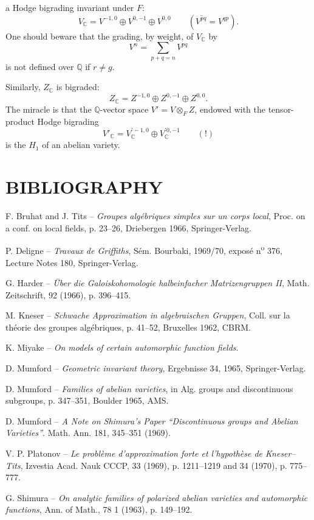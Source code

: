 \documentclass[10pt]{article}
\newcommand{\C}{\mathbb C}
\newcommand{\Q}{\mathbb Q}
\begin{document}
a Hodge bigrading invariant under $F$:
\[
V_{\C}=V^{-1,0}\oplus V^{0,-1}\oplus V^{0,0}
\qquad(\overline{V^{pq}}=V^{qp}).
\]
One should beware that the grading, by weight, of $V_{\C}$ by
\[
V^n=\sum_{p+q=n}V^{pq}
\]
is not defined over $\Q$ if $r\ne g$.

Similarly, $Z_{\C}$ is bigraded:
\[
Z_{\C}=Z^{-1,0}\oplus Z^{0,-1}\oplus Z^{0,0}.
\]
The miracle is that the $\Q$-vector space $V'=V\otimes_F Z$, endowed with the tensor-product Hodge bigrading
\[
V'_{\C}=V_{\C}^{\prime -1,0}\oplus V_{\C}^{\prime 0,-1}\qquad(!)
\]
is the $H_1$ of an abelian variety.

\section*{BIBLIOGRAPHY}

\begin{description}[leftmargin=3.0em,labelwidth=2.4em,style=nextline]
\item[{[1]}] F. Bruhat and J. Tits -- \emph{Groupes algébriques simples sur un corps local}, Proc. on a conf. on local fields, p. 23--26, Driebergen 1966, Springer-Verlag.
\item[{[2]}] P. Deligne -- \emph{Travaux de Griffiths}, Sém. Bourbaki, 1969/70, exposé n\textsuperscript{o} 376, Lecture Notes 180, Springer-Verlag.
\item[{[3]}] G. Harder -- \emph{Über die Galoiskohomologie halbeinfacher Matrizengruppen II}, Math. Zeitschrift, 92 (1966), p. 396--415.
\item[{[4]}] M. Kneser -- \emph{Schwache Approximation in algebraischen Gruppen}, Coll. sur la théorie des groupes algébriques, p. 41--52, Bruxelles 1962, CBRM.
\item[{[5]}] K. Miyake -- \emph{On models of certain automorphic function fields}.
\item[{[6]}] D. Mumford -- \emph{Geometric invariant theory}, Ergebnisse 34, 1965, Springer-Verlag.
\item[{[7]}] D. Mumford -- \emph{Families of abelian varieties}, in Alg. groups and discontinuous subgroups, p. 347--351, Boulder 1965, AMS.
\item[{[8]}] D. Mumford -- \emph{A Note on Shimura's Paper ``Discontinuous groups and Abelian Varieties''}. Math. Ann. 181, 345--351 (1969).
\item[{[9]}] V. P. Platonov -- \emph{Le problème d'approximation forte et l'hypothèse de Kneser--Tits}, Izvestia Acad. Nauk CCCP, 33 (1969), p. 1211--1219 and 34 (1970), p. 775--777.
\item[{[10]}] G. Shimura -- \emph{On analytic families of polarized abelian varieties and automorphic functions}, Ann. of Math., 78 1 (1963), p. 149--192.

\end{description}
\end{document}
